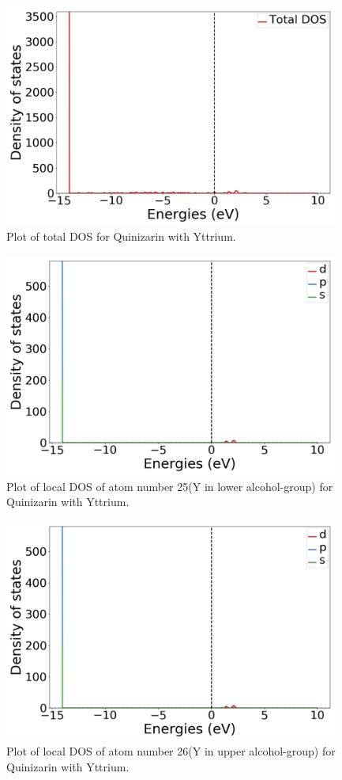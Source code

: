 \documentclass{article}
\begin{document}
  \begin{figure}[H]
      \centering
      \includegraphics[width = 11cm]{../fig/Y_TDOS_1.png}
      \caption{Plot of total DOS for Quinizarin with Yttrium. }
      \label{fig:Y_TDOS_1}
  \end{figure}

  \begin{figure}[H]
      \centering
      \includegraphics[width = 11cm]{../fig/Y_LDOS25_1.png}
      \caption{Plot of local DOS of atom number 25(Y in lower alcohol-group) for Quinizarin with Yttrium. }
      \label{fig:Y_LDOS25_1}
  \end{figure}

  \begin{figure}[H]
      \centering
      \includegraphics[width = 11cm]{../fig/Y_LDOS26_1.png}
      \caption{Plot of local DOS of atom number 26(Y in upper alcohol-group) for Quinizarin with Yttrium. }
      \label{fig:Y_LDOS26_1}
  \end{figure}
\end{document}
